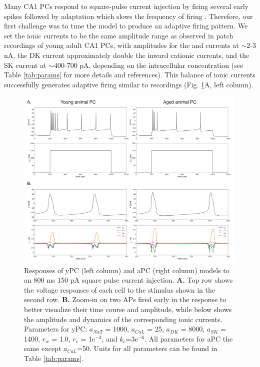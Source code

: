 \documentclass[12pt]{article}
\begin{document}
Many CA1 PCs respond to square-pulse current injection by firing several early spikes followed by adaptation which slows the frequency of firing \citep{gant2006early,madison1984control,stackman2002small,borde1995activity,gu2008sk,jung2009biphasic,kim2005kv4,malik2012enhanced}. 
Therefore, our first challenge was to tune the model to produce an adaptive firing pattern. 
We set the ionic currents to be the same amplitude range as observed in patch recordings of young adult CA1 PCs, with amplitudes for the {\Na} and {\Ca} currents at $\sim$2-3 nA, the DK current approximately double the inward cationic currents, and the SK current at $\sim$400-700 pA, depending on the intracellular {\Ca} concentration (see Table \ref{tab:params} for more details and references). This balance of ionic currents successfully generates adaptive firing similar to recordings (Fig. \ref{fig:adaptation}A, left column).

\begin{figure}[h!]
    \centering
     \includegraphics[width=0.99\textwidth]{figures/fig1.png} 
    \caption{Responses of yPC (left column) and aPC (right column)  models to an 800 ms 150 pA square pulse current injection. \textbf{A.} Top row shows the voltage responses of each cell to the stimulus shown in the second row. \textbf{B.} Zoom-in on two APs fired early in the response to better visualize their time course and amplitude, while below shows the amplitude and dynamics of the corresponding ionic currents. Parameters for yPC: $a_{NaT}$ = 1000, $a_{CaL}$ = 25, $a_{DK}$ = 8000, $a_{SK}$ = 1400, $r_{w}$ = 1.0, $r_{c}$ = 1e$^{-3}$, and $k_{c}$=3e$^{-6}$. All parameters for aPC the same except $a_{CaL}$=50. Units for all parameters can be found in Table \ref{tab:params}.}
    \label{fig:adaptation}
\end{figure}
\end{document}
